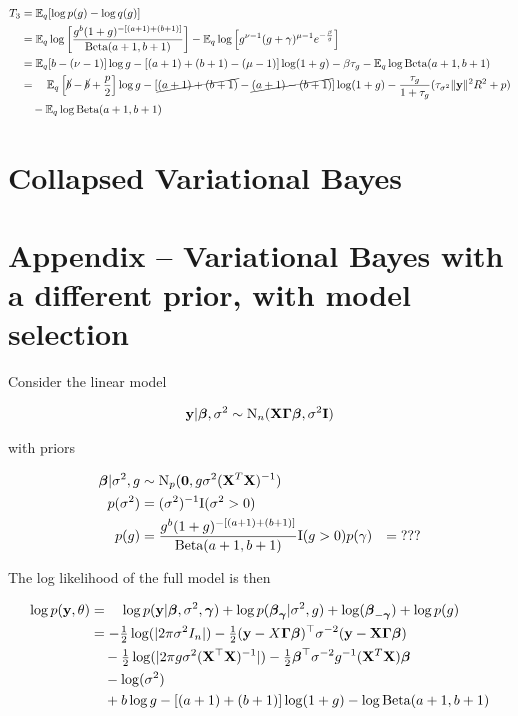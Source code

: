 \documentclass{amsart}[12pt]
\begin{document}
\begin{align*}
T_3 &= \mathbb{E}_q [\log p(g) - \log q(g)] \\
&= \mathbb{E}_q \log \left [ \frac{g^b (1 + g)^{-[(a + 1) + (b + 1)]}}{\text{Beta}(a + 1, b + 1)} \right ] -
	\mathbb{E}_q \log \left [ g^{\nu - 1} (g + \gamma)^{\mu - 1} e^{-\frac{\beta}{g}} \right ] \\
&= \mathbb{E}_q [b - (\nu - 1)] \log g - [(a + 1) + (b + 1) - (\mu - 1)] \log (1 + g) - \beta \tau_g
   - \mathbb{E}_q \log \text{Beta}(a + 1,  b + 1) \\
&= \quad \mathbb{E}_q \left [\cancel{b} - \cancel{b} + \frac{p}{2} \right ] \log g - [\cancel{(a + 1) + (b + 1)} - \cancel{(a + 1) - (b + 1)}] \log (1 + g)
    - \frac{\tau_g}{1 + \tau_g} (\tau_{\sigma^2} \|{\bf y}\|^2 R^2 + p)\\
&   \quad - \mathbb{E}_q \log \text{Beta}(a + 1,  b + 1) \\
\end{align*}

\section{Collapsed Variational Bayes}


\section{Appendix -- Variational Bayes with a different prior, with model selection}

Consider the linear model

\begin{align*}
{\bf y} | {\boldsymbol \beta}, \sigma^2 \sim \text{N}_n({\bf X} {\boldsymbol \Gamma} {\boldsymbol \beta}, \sigma^2 {\bf I})
\end{align*}

with priors

\begin{align*}
{\boldsymbol\beta} | \sigma^2, g &\sim \text{N}_p({\bf 0}, g \sigma^2 ({\bf X}^T {\bf X})^{-1}) \\
p(\sigma^2) &= (\sigma^2)^{-1} \text{I}(\sigma^2 > 0) \\
p(g) &= \frac{g^b (1 + g)^{-[(a + 1) + (b + 1)]}}{\text{Beta}(a + 1, b + 1)} \text{I}(g > 0)
p(\gamma) &= \text{???}
\end{align*}

The log likelihood of the full model is then

\begin{align*}
\log p({\bf y}, \theta) &= \quad\log p({\bf y}|{\boldsymbol \beta}, \sigma^2, {\boldsymbol \gamma}) + \log p({\boldsymbol \beta}_{\boldsymbol \gamma} | \sigma^2, g) + \log({\boldsymbol \beta}_{-{\boldsymbol \gamma}}) + \log p(g) \\
&= -\tfrac{1}{2} \log(|2 \pi \sigma^2 I_n|) - \tfrac{1}{2} ({\bf y} - X {\boldsymbol \Gamma} {\boldsymbol \beta})^\top \sigma^{-2} ({\bf y} - {\bf X} {\boldsymbol \Gamma} {\boldsymbol \beta}) \\
&\quad -\tfrac{1}{2} \log(|2 \pi g \sigma^2 ({\bf X}^\top {\bf X})^{-1}|) -\tfrac{1}{2} {\boldsymbol \beta}^\top \sigma^{-2} g^{-1} ({\bf X}^T {\bf X}) {\boldsymbol \beta} \\
&\quad - \log (\sigma^2) \\
&\quad + b \log g - [(a + 1) + (b + 1)] \log (1 + g) - \log \text{Beta}(a + 1, b + 1)
\end{align*}
\end{document}
